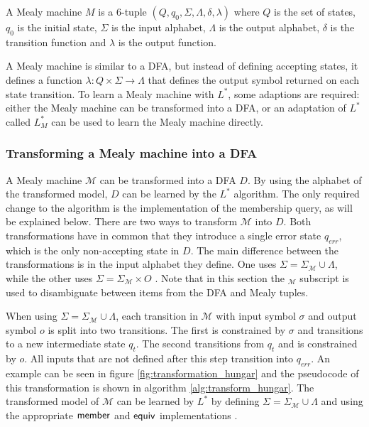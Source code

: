 \begin{definition}\label{def:mealy_machine}
  A Mealy machine $M$ is a 6-tuple $(Q, q_0, \Sigma, \Lambda, \delta, \lambda)$
  where $Q$ is the set of states, $q_0$ is the initial state, $\Sigma$ is the
  input alphabet, $\Lambda$ is the output alphabet, $\delta$ is the transition
  function and $\lambda$ is the output function.
\end{definition}

A Mealy machine is similar to a DFA, but instead of defining accepting states,
it defines a function $\lambda: Q \times \Sigma \to \Lambda$ that defines
the output symbol returned on each state transition. To learn a Mealy machine
with $L^*$, some adaptions are required: either the Mealy machine can be
transformed into a DFA, or an adaptation of $L^*$ called $L^*_{M}$ can be used
to learn the Mealy machine directly.

\subsubsection {Transforming a Mealy machine into a DFA}

A Mealy machine $\mathcal{M}$ can be transformed into a DFA $D$. By using the
alphabet of the transformed model, $D$ can be learned by the $L^*$ algorithm.
The only required change to the algorithm is the implementation of the
membership query, as will be explained below. There are two ways to transform
$\mathcal{M}$ into $D$. Both transformations have in common that they introduce
a single error state $q_{err}$, which is the only non-accepting state in $D$.
The main difference between the transformations is in the input alphabet they
define. One uses $\Sigma = \Sigma_\mathcal{M} \cup \Lambda$\cite{Hungar2003},
while the other uses $\Sigma = \Sigma_\mathcal{M} \times O$ \cite{Makinen2001}.
Note that in this section the $_{\mathcal{M}}$ subscript is used to disambiguate
between items from the DFA and Mealy tuples.


When using $\Sigma = \Sigma_\mathcal{M} \cup \Lambda$, each transition in
$\mathcal{M}$ with input symbol $\sigma$ and output symbol $o$ is split into two
transitions. The first is constrained by $\sigma$ and transitions to a new
intermediate state $q_t$. The second transitions from $q_t$ and is constrained
by $o$. All inputs that are not defined after this step transition into
$q_{err}$. An example can be seen in figure \ref{fig:transformation_hungar} and
the pseudocode of this transformation is shown in algorithm
\ref{alg:transform_hungar}. The transformed model of $\mathcal{M}$ can be
learned by $L^*$ by defining $\Sigma = \Sigma_\mathcal{M} \cup \Lambda$
\cite{Shahbaz2009} and using the appropriate $\mathsf{member}$ and $\mathsf{equiv}$ implementations
\cite{Hungar2003,Niese2003}.

